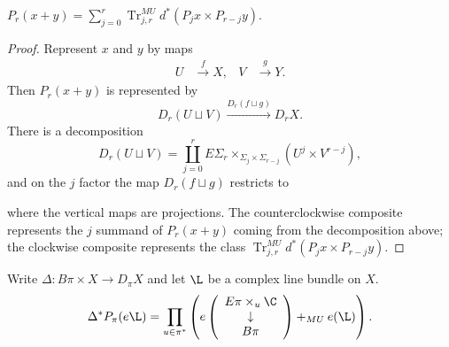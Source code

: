 \begin{lemma}
$P_r(x + y) = \sum_{j=0}^r \operatorname{Tr}_{j,r}^{MU} d^*(P_j x \times P_{r-j}y)$.

\end{lemma}
\begin{proof}
Represent $x$ and $y$ by maps
\begin{align*}
U & \xrightarrow{f} X, &
V & \xrightarrow{g} Y.
\end{align*}
Then $P_r(x+y)$ is represented by \[D_r(U \sqcup V) \xrightarrow{D_r(f \sqcup g)} D_r X.\]  There is a decomposition \[D_r(U \sqcup V) = \coprod_{j=0}^r E\Sigma_r \times_{\Sigma_j \times \Sigma_{r-j}} (U^j \times V^{r-j}),\] and on the $j$ factor the map $D_r(f \sqcup g)$ restricts to
\begin{center}
\end{center}
where the vertical maps are projections.  The counterclockwise composite represents the $j$ summand of $P_r(x+y)$ coming from the decomposition above; the clockwise composite represents the class $\operatorname{Tr}_{j,r}^{MU} d^*(P_j x \times P_{r-j} y)$. \qedhere
\end{proof}


\begin{lemma}
Write $\Delta: B\pi \times X \to D_\pi X$ and let $\L$ be a complex line bundle on $X$.
\[\Delta^* P_\pi(e\L) = \prod_{u \in \pi^*} \left( e\left(\begin{array}{c} E\pi \times_u \C \\ \downarrow \\ B\pi \end{array} \right) +_{MU} e(\L) \right).\]
\end{lemma}

